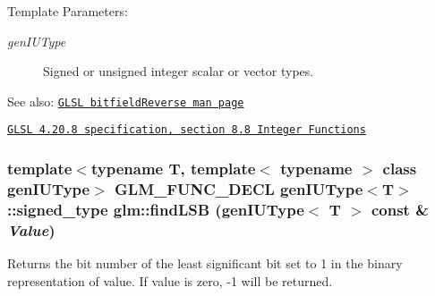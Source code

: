 \begin{Desc}
\item[Template Parameters:]
\begin{description}
\item[{\em genIUType}]Signed or unsigned integer scalar or vector types.\end{description}
\end{Desc}
\begin{Desc}
\item[See also:]\href{http://www.opengl.org/sdk/docs/manglsl/xhtml/bitfieldReverse.xml}{\tt GLSL bitfieldReverse man page} 

\href{http://www.opengl.org/registry/doc/GLSLangSpec.4.20.8.pdf}{\tt GLSL 4.20.8 specification, section 8.8 Integer Functions} \end{Desc}
\hypertarget{group__core__func__integer_gdda1c11511dea60cd3f0b414d8baa9c2}{
\subsubsection[findLSB]{\setlength{\rightskip}{0pt plus 5cm}template$<$typename T, template$<$ typename $>$ class genIUType$>$ GLM\_\-FUNC\_\-DECL genIUType$<$T$>$::signed\_\-type glm::findLSB (genIUType$<$ T $>$ const \& {\em Value})}}
\label{group__core__func__integer_gdda1c11511dea60cd3f0b414d8baa9c2}


Returns the bit number of the least significant bit set to 1 in the binary representation of value. If value is zero, -1 will be returned.

